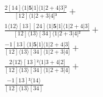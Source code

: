 \documentclass[varwidth, border=5pt]{standalone}
\begin{document}
\begin{my}
$\begin{gathered}
\scriptscriptstyle\frac{2[14]⟨1|𝟓|1]⟨1|2+4|3]²}{[12]⟨1|2+3|4]³} +\\
\scriptscriptstyle\frac{1⟨12⟩[13][24]⟨1|𝟓|1]⟨1|2+4|3]}{[12]⟨13⟩[34]⟨1|2+3|4]²} +\\
\scriptscriptstyle\frac{-1[13]⟨1|𝟓|1]⟨1|2+4|3]}{[12]⟨13⟩[34]⟨1|2+3|4]} +\\
\scriptscriptstyle\frac{2⟨12⟩[13]²⟨1|3+4|2]}{[12]⟨13⟩[34]⟨1|2+3|4]} +\\
\scriptscriptstyle\frac{-1[13]²⟨14⟩}{[12]⟨13⟩[34]} \phantom{+}
\end{gathered}$
\end{my}
\end{document}
